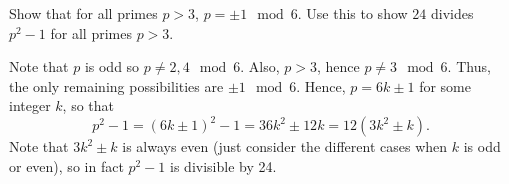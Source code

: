 \documentclass[11pt,dvipsnames]{book}
\numberwithin{figure}{section} %
\numberwithin{table}{section} %
\begin{document}
\begin{exercise} Show that for all primes $p>3$, $p = \pm 1\mod 6$. Use this to show $24$ divides $p^2-1$ for all primes $p>3$.

\begin{solution}
Note that $p$ is odd so $p\not = 2,4\mod 6$. Also, $p>3$, hence $p\neq 3\mod 6$. Thus, the only remaining possibilities are $\pm 1 \mod  6$. Hence, $p=6k\pm 1$ for some integer $k$, so that
\[
p^2-1 = (6k\pm 1)^2-1=36k^2\pm 12k=12(3k^2\pm k).
\]
Note that $3k^2\pm k$ is always even (just consider the different cases when $k$ is odd or even), so in fact $p^2-1$ is divisible by 24.

\end{solution}

\end{exercise}

%
%
%
%
%
%
%
%
\end{document}
